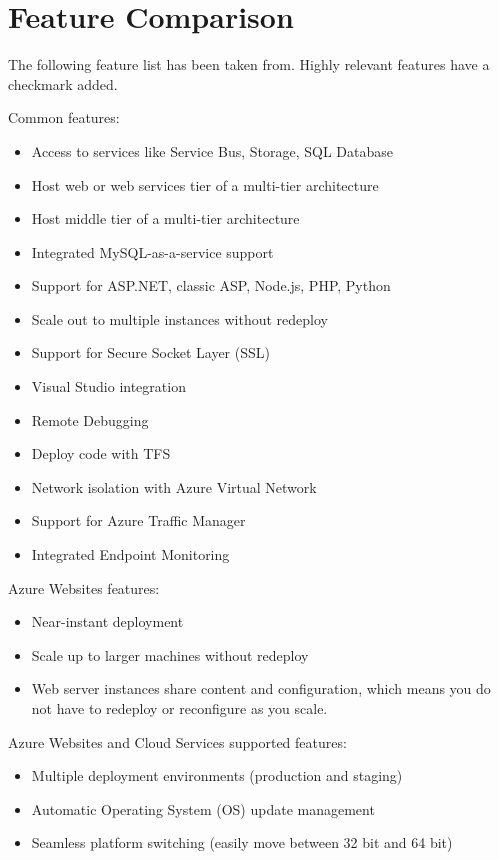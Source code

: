 \section{Feature Comparison}

The following feature list has been taken from\cite{Microsoft_Corporation2014-gg}. Highly relevant features have a checkmark added.
 
Common features:
\begin{itemize}
\item Access to services like Service Bus, Storage, SQL Database \checkmark
\item Host web or web services tier of a multi-tier architecture \checkmark
\item Host middle tier of a multi-tier architecture \checkmark
\item Integrated MySQL-as-a-service support
\item Support for ASP.NET, classic ASP, Node.js, PHP, Python\checkmark
\item Scale out to multiple instances without redeploy \checkmark
\item Support for Secure Socket Layer (SSL)
\item Visual Studio integration \checkmark
\item Remote Debugging \checkmark
\item Deploy code with TFS
\item Network isolation with Azure Virtual Network
\item Support for Azure Traffic Manager \checkmark
\item Integrated Endpoint Monitoring
\end{itemize}


Azure Websites features:
\begin{itemize}
\item Near-instant deployment \checkmark
\item Scale up to larger machines without redeploy \checkmark
\item Web server instances share content and configuration, which means you do not have to redeploy or reconfigure as you scale.
\end{itemize}

Azure Websites and Cloud Services supported features:
\begin{itemize}
\item Multiple deployment environments (production and staging) \checkmark
\item Automatic Operating System (OS) update management \checkmark
\item Seamless platform switching (easily move between 32 bit and 64 bit)
\end{itemize}

